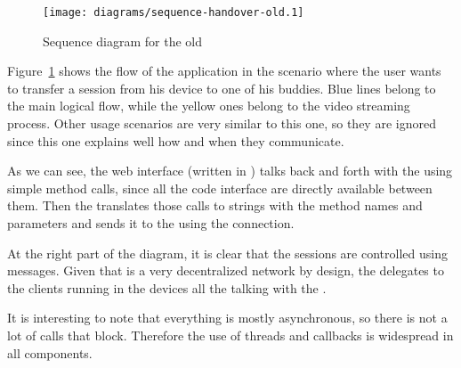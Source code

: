 \begin{figure}[htbp]
  \centering
    \texttt{[image: diagrams/sequence-handover-old.1]}
  \caption{Sequence diagram for the old }
  \label{fig:sequence-handover-old}
\end{figure}

Figure~\ref{fig:sequence-handover-old} shows the flow of the application in the scenario where the user wants to transfer a session from his device to one of his buddies.
Blue lines belong to the main logical flow, while the yellow ones belong to the video streaming process.
Other usage scenarios are very similar to this one, so they are ignored since this one explains well how and when they communicate.

As we can see, the web interface (written in ) talks back and forth with the  using simple method calls, since all the code interface are directly available between them.
Then the  translates those calls to strings with the method names and parameters and sends it to the  using the  connection.

At the right part of the diagram, it is clear that the sessions are controlled using  messages.
Given that  is a very decentralized network by design, the  delegates to the  clients running in the devices all the talking with the .

It is interesting to note that everything is mostly asynchronous, so there is not a lot of calls that block.
Therefore the use of threads and callbacks is widespread in all components.


